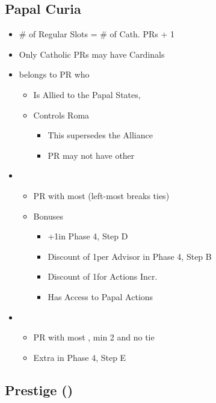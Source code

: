 \documentclass[10pt]{article}
\begin{document}
\subsection*{Papal Curia }
\begin{itemize}
	\item \# of Regular \cardinal Slots = \# of Cath. PRs + 1
	\item Only Catholic PRs may have Cardinals
	\item {} belongs to PR who
	\begin{itemize}
		\item Is Allied to the \guilsinglright Papal States, 
		\item Controls Roma
		\begin{itemize}
			\item This supersedes the Alliance
			\item PR may not have other \cardinals
		\end{itemize}
	\end{itemize}
	\item {}
	\begin{itemize}
		\item PR with most \cardinals (left-most breaks ties)
		\item Bonuses
		\begin{itemize}
			\item +1\diplopower in Phase 4, Step D
			\item Discount of 1\ducat per Advisor in Phase 4, Step B
			\item Discount of 1\adminpower for Actions Incr. \stability
			\item Has Access to Papal Actions
		\end{itemize}
	\end{itemize}
	\item {}
	\begin{itemize}
		\item PR with most \cardinals, min 2 and no tie
		\item Extra \prestige in Phase 4, Step E
	\end{itemize}
\end{itemize}

\subsection*{Prestige (\prestige) }
\end{document}
